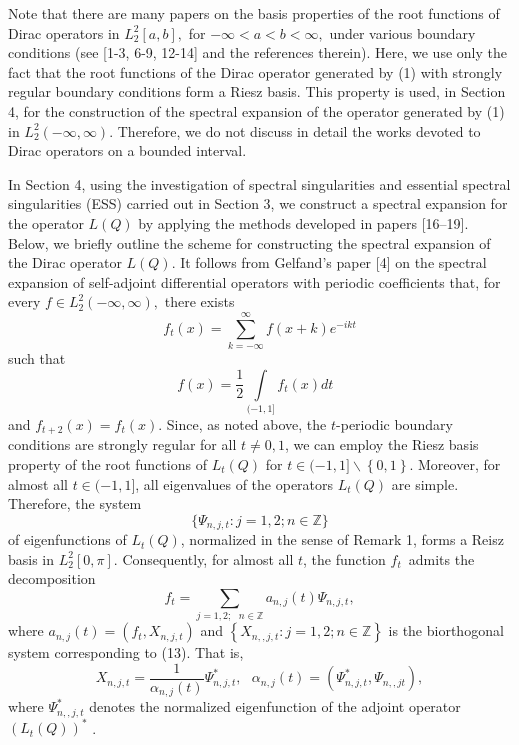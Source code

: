 \documentclass{article}%
\begin{document}
Note that there are many papers on the basis properties of the root functions
of Dirac operators in $L_{2}^{2}[a,b],$ for $-\infty<a<b<\infty,$ under
various boundary conditions (see [1-3, 6-9, 12-14] and the references
therein). Here, we use only the fact that the root functions of the Dirac
operator generated by (1) with strongly regular boundary conditions form a
Riesz basis. This property is used, in Section 4, for the construction of the
spectral expansion of the operator generated by (1) in $L_{2}^{2}%
(-\infty,\infty).$ Therefore, we do not discuss in detail the works devoted to
Dirac operators on a bounded interval.

In Section 4, using the investigation of spectral singularities and essential
spectral singularities (ESS) carried out in Section 3, we construct a spectral
expansion for the operator $L(Q)$ by applying the methods developed in papers
[16--19]. Below, we briefly outline the scheme for constructing the spectral
expansion of the Dirac operator $L(Q).$ It follows from Gelfand's paper [4] on
the spectral expansion of self-adjoint differential operators with periodic
coefficients that, for every $f\in L_{2}^{2}(-\infty,\infty),$ there exists%
\begin{equation}
f_{t}(x)=\sum_{k=-\infty}^{\infty}f(x+k)e^{-ikt}\tag{11}%
\end{equation}
such that
\begin{equation}
f(x)=\frac{1}{2}\int\limits_{(-1,1]}f_{t}(x)dt\text{ }\tag{12}%
\end{equation}
and $f_{t+2}(x)=f_{t}(x).$ Since, as noted above, the $t$-periodic boundary
conditions are strongly regular for all $t\neq0,1$, we can employ the Riesz
basis property of the root functions of $L_{t}(Q)$ for $t\in(-1,1]\backslash
\left\{  0,1\right\}  .$ Moreover, for almost all $t\in(-1,1]$, all
eigenvalues of the operators $L_{t}(Q)$ are simple. Therefore, the system
\begin{equation}
\{\Psi_{n,j,t}:j=1,2;n\in\mathbb{Z}\}\tag{13}%
\end{equation}
of eigenfunctions of $L_{t}(Q)$, normalized in the sense of Remark 1, forms a
Reisz basis in $L_{2}^{2}[0,\pi].$ Consequently, for almost all $t$, the
function $f_{t}$~admits the decomposition
\begin{equation}
f_{t}=\sum_{j=1,2;\text{ }n\in\mathbb{Z}}a_{n,j}(t)\Psi_{n,j,t},\tag{14}%
\end{equation}
where $a_{n,j}(t)=(f_{t},X_{n,j,t})$ and $\left\{  X_{n,,j,t}:j=1,2;n\in
\mathbb{Z}\right\}  $ is the biorthogonal system corresponding to (13). That
is,
\[
X_{n,j,t}=\frac{1}{\alpha_{n,j}(t)}\Psi_{n,j,t}^{\ast},\text{ }\alpha
_{n,j}(t)=\left(  \Psi_{n,j,t}^{\ast},\Psi_{n,,jt}\right)  ,
\]
where $\Psi_{n,,j,t}^{\ast}$ denotes the normalized eigenfunction of the
adjoint operator $(L_{t}(Q))^{\ast}$ .
\end{document}
